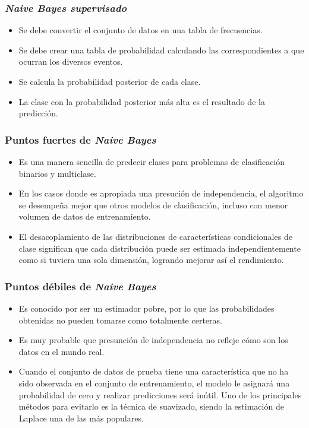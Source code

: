 \documentclass[sigconf]{acmart}
\begin{document}
\subsubsection{{\itshape Naive Bayes supervisado}}
\begin{itemize}
    \item Se debe convertir el conjunto de datos en una tabla de frecuencias.
    \item Se debe crear una tabla de probabilidad calculando las correspondientes a que ocurran los diversos eventos.
    \item Se calcula la probabilidad posterior de cada clase.
    \item La clase con la probabilidad posterior más alta es el resultado de la predicción.
\end{itemize}

\subsubsection{Puntos fuertes de {\itshape Naive Bayes}} 
\begin{itemize}
    \item Es una manera sencilla de predecir clases para problemas de clasificación binarios y multiclase.
    \item En los casos donde es apropiada una presución de independencia, el algoritmo se desempeña mejor que otros modelos de clasificación, incluso con menor volumen de datos de entrenamiento.
    \item El desacoplamiento de las distribuciones de características condicionales de clase significan que cada distribución puede ser estimada independientemente como si tuviera una sola dimensión, logrando mejorar así el rendimiento.
\end{itemize}

\subsubsection{Puntos débiles de {\itshape Naive Bayes}}
\begin{itemize}
    \item Es conocido por ser un estimador pobre, por lo que las probabilidades obtenidas no pueden tomarse como totalmente certeras.
    \item Es muy probable que presunción de independencia no refleje cómo son los datos en el mundo real.
    \item Cuando el conjunto de datos de prueba tiene una característica que no ha sido observada en el conjunto de entrenamiento, el modelo le asignará una probabilidad de cero y realizar predicciones será inútil. Uno de los principales métodos para evitarlo es la técnica de suavizado, siendo la estimación de Laplace una de las más populares.
\end{itemize}
\end{document}
